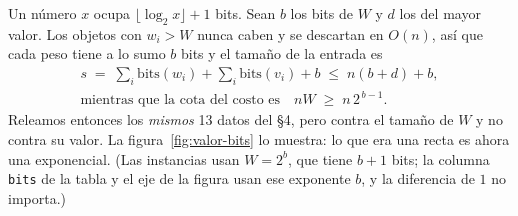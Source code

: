 \documentclass[11pt]{article}
\begin{document}
Un número $x$ ocupa $\lfloor\log_2x\rfloor+1$ bits. Sean $b$ los bits de $W$ y $d$ los del mayor valor. Los
objetos con $w_i>W$ nunca caben y se descartan en $O(n)$, así que cada peso tiene a lo sumo $b$ bits y el
tamaño de la entrada es
\[
\begin{gathered}
  s\;=\;\sum_i\mathrm{bits}(w_i)+\sum_i\mathrm{bits}(v_i)+b\;\le\;n(b+d)+b ,\\[2pt]
  \text{mientras que la cota del costo es}\quad nW\;\ge\;n\,2^{\,b-1}.
\end{gathered}
\]
Releamos entonces los \emph{mismos} 13 datos del §4, pero contra el tamaño de $W$ y no contra su valor. La
figura~\ref{fig:valor-bits} lo muestra: lo que era una recta es ahora una exponencial. (Las instancias usan
$W=2^{b}$, que tiene $b+1$ bits; la columna \texttt{bits} de la tabla y el eje de la figura usan ese exponente $b$, y
la diferencia de $1$ no importa.)
\end{document}
